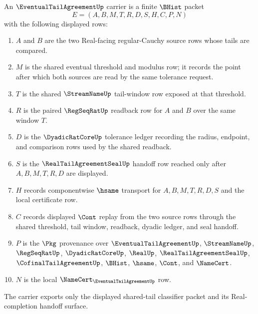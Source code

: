 \begin{definition}
\label{def:eventual-tail-agreement-carrier}
An $\EventualTailAgreementUp$ carrier is a finite $\BHist$ packet
$$
E=(A,B,M,T,R,D,S,H,C,P,N)
$$
with the following displayed rows:
\begin{enumerate}
\item $A$ and $B$ are the two Real-facing regular-Cauchy source rows whose tails are compared.
\item $M$ is the shared eventual threshold and modulus row; it records the point after which both sources are read by the same tolerance request.
\item $T$ is the shared $\StreamNameUp$ tail-window row exposed at that threshold.
\item $R$ is the paired $\RegSeqRatUp$ readback row for $A$ and $B$ over the same window $T$.
\item $D$ is the $\DyadicRatCoreUp$ tolerance ledger recording the radius, endpoint, and comparison rows used by the shared readback.
\item $S$ is the $\RealTailAgreementSealUp$ handoff row reached only after $A,B,M,T,R,D$ are displayed.
\item $H$ records componentwise $\hsame$ transport for $A,B,M,T,R,D,S$ and the local certificate row.
\item $C$ records displayed $\Cont$ replay from the two source rows through the shared threshold, tail window, readback, dyadic ledger, and seal handoff.
\item $P$ is the $\Pkg$ provenance over $\EventualTailAgreementUp$, $\StreamNameUp$, $\RegSeqRatUp$, $\DyadicRatCoreUp$, $\RealUp$, $\RealTailAgreementSealUp$, $\CofinalTailAgreementUp$, $\BHist$, $\hsame$, $\Cont$, and $\NameCert$.
\item $N$ is the local $\NameCert_{\EventualTailAgreementUp}$ row.
\end{enumerate}
The carrier exports only the displayed shared-tail classifier packet and its Real-completion handoff surface.
\end{definition}

